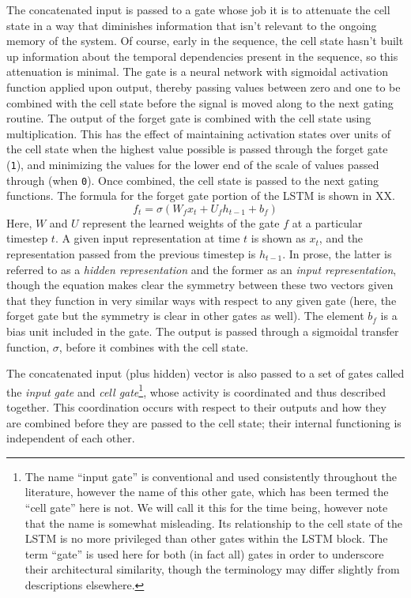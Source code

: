 \documentclass[
  american,
  man,floatsintext]{apa6}
\begin{document}
The concatenated input is passed to a gate whose job it is to attenuate the cell state in a way that diminishes information that isn't relevant to the ongoing memory of the system. Of course, early in the sequence, the cell state hasn't built up information about the temporal dependencies present in the sequence, so this attenuation is minimal. The gate is a neural network with sigmoidal activation function applied upon output, thereby passing values between zero and one to be combined with the cell state before the signal is moved along to the next gating routine. The output of the forget gate is combined with the cell state using multiplication. This has the effect of maintaining activation states over units of the cell state when the highest value possible is passed through the forget gate (\texttt{1}), and minimizing the values for the lower end of the scale of values passed through (when \texttt{0}). Once combined, the cell state is passed to the next gating functions. The formula for the forget gate portion of the LSTM is shown in XX.
\[
f_t = \sigma(W_fx_t + U_fh_{t-1} + b_f)
\]
Here, \(W\) and \(U\) represent the learned weights of the gate \(f\) at a particular timestep \(t\). A given input representation at time \(t\) is shown as \(x_t\), and the representation passed from the previous timestep is \(h_{t-1}\). In prose, the latter is referred to as a \emph{hidden representation} and the former as an \emph{input representation}, though the equation makes clear the symmetry between these two vectors given that they function in very similar ways with respect to any given gate (here, the forget gate but the symmetry is clear in other gates as well). The element \(b_f\) is a bias unit included in the gate. The output is passed through a sigmoidal transfer function, \(\sigma\), before it combines with the cell state.

The concatenated input (plus hidden) vector is also passed to a set of gates called the \emph{input gate} and \emph{cell gate}\footnote{The name ``input gate'' is conventional and used consistently throughout the literature, however the name of this other gate, which has been termed the ``cell gate'' here is not. We will call it this for the time being, however note that the name is somewhat misleading. Its relationship to the cell state of the LSTM is no more privileged than other gates within the LSTM block. The term ``gate'' is used here for both (in fact all) gates in order to underscore their architectural similarity, though the terminology may differ slightly from descriptions elsewhere.}, whose activity is coordinated and thus described together. This coordination occurs with respect to their outputs and how they are combined before they are passed to the cell state; their internal functioning is independent of each other.
\end{document}
